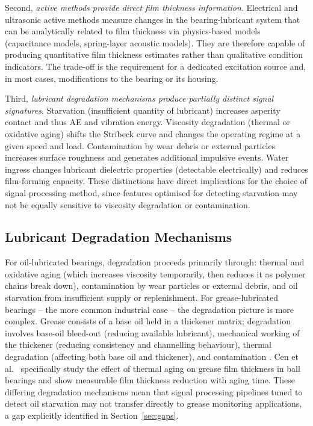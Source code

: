 Second, \textit{active methods provide direct film thickness information}. Electrical and ultrasonic active methods measure changes in the bearing-lubricant system that can be analytically related to film thickness via physics-based models (capacitance models, spring-layer acoustic models). They are therefore capable of producing quantitative film thickness estimates rather than qualitative condition indicators. The trade-off is the requirement for a dedicated excitation source and, in most cases, modifications to the bearing or its housing.

Third, \textit{lubricant degradation mechanisms produce partially distinct signal signatures}. Starvation (insufficient quantity of lubricant) increases asperity contact and thus AE and vibration energy. Viscosity degradation (thermal or oxidative aging) shifts the Stribeck curve and changes the operating regime at a given speed and load. Contamination by wear debris or external particles increases surface roughness and generates additional impulsive events. Water ingress changes lubricant dielectric properties (detectable electrically) and reduces film-forming capacity. These distinctions have direct implications for the choice of signal processing method, since features optimised for detecting starvation may not be equally sensitive to viscosity degradation or contamination.

\subsection{Lubricant Degradation Mechanisms}
\label{subsec:degradation}
For oil-lubricated bearings, degradation proceeds primarily through: thermal and oxidative aging (which increases viscosity temporarily, then reduces it as polymer chains break down), contamination by wear particles or external debris, and oil starvation from insufficient supply or replenishment. For grease-lubricated bearings -- the more common industrial case -- the degradation picture is more complex. Grease consists of a base oil held in a thickener matrix; degradation involves base-oil bleed-out (reducing available lubricant), mechanical working of the thickener (reducing consistency and channelling behaviour), thermal degradation (affecting both base oil and thickener), and contamination \cite{lugt_grease_2012,sahu_grease_2022,zhang_grease_2021}. Cen et al.\ \cite{cen_effect_2025} specifically study the effect of thermal aging on grease film thickness in ball bearings and show measurable film thickness reduction with aging time. These differing degradation mechanisms mean that signal processing pipelines tuned to detect oil starvation may not transfer directly to grease monitoring applications, a gap explicitly identified in Section~\ref{sec:gaps}.
